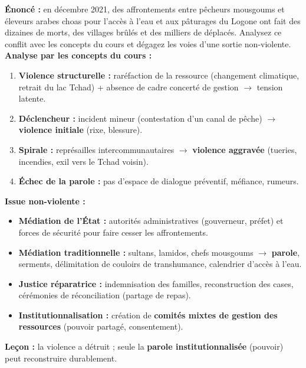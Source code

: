 \documentclass[11pt]{article}
\begin{document}
\begin{exoresolu}
\textbf{Énoncé :} en décembre 2021, des affrontements entre pêcheurs mousgoums et éleveurs arabes choas pour l'accès à l'eau et aux pâturages du Logone ont fait des dizaines de morts, des villages brûlés et des milliers de déplacés. Analysez ce conflit avec les concepts du cours et dégagez les voies d'une sortie non-violente.
\tcblower
\textbf{Analyse par les concepts du cours :}
\begin{enumerate}
\item \textbf{Violence structurelle :} raréfaction de la ressource (changement climatique, retrait du lac Tchad) + absence de cadre concerté de gestion $\rightarrow$ tension latente.
\item \textbf{Déclencheur :} incident mineur (contestation d'un canal de pêche) $\rightarrow$ \textbf{violence initiale} (rixe, blessure).
\item \textbf{Spirale :} représailles intercommunautaires $\rightarrow$ \textbf{violence aggravée} (tueries, incendies, exil vers le Tchad voisin).
\item \textbf{Échec de la parole :} pas d'espace de dialogue préventif, méfiance, rumeurs.
\end{enumerate}
\textbf{Issue non-violente :}
\begin{itemize}
\item \textbf{Médiation de l'État :} autorités administratives (gouverneur, préfet) et forces de sécurité pour faire cesser les affrontements.
\item \textbf{Médiation traditionnelle :} sultans, lamidos, chefs mousgoums $\rightarrow$ \textbf{parole}, serments, délimitation de couloirs de transhumance, calendrier d'accès à l'eau.
\item \textbf{Justice réparatrice :} indemnisation des familles, reconstruction des cases, cérémonies de réconciliation (partage de repas).
\item \textbf{Institutionnalisation :} création de \textbf{comités mixtes de gestion des ressources} (pouvoir partagé, consentement).
\end{itemize}
\textbf{Leçon :} la violence a détruit ; seule la \textbf{parole institutionnalisée} (pouvoir) peut reconstruire durablement.
\end{exoresolu}
\end{document}
